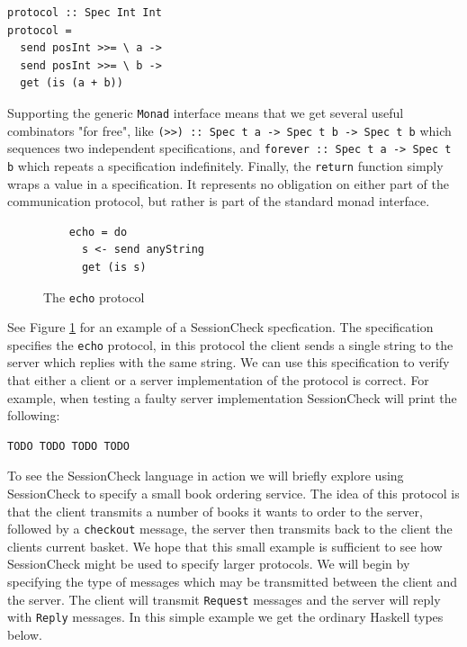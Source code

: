 \documentclass{article}
\begin{document}
\begin{verbatim}
protocol :: Spec Int Int
protocol =
  send posInt >>= \ a ->
  send posInt >>= \ b ->
  get (is (a + b))
\end{verbatim}


%
Supporting the generic \texttt{Monad} interface means that we get several useful combinators "for free", like
\texttt{(>>) :: Spec t a -> Spec t b -> Spec t b} which sequences two independent specifications, and
\texttt{forever :: Spec t a -> Spec t b} which repeats a specification indefinitely.
%
Finally, the \texttt{return} function simply wraps a value in a specification.
%
It represents no obligation on either part of the communication protocol, but rather is part of the standard
monad interface.
%

\begin{figure}
  \begin{verbatim}
    echo = do
      s <- send anyString
      get (is s)
  \end{verbatim}
  \caption{\label{fig:SessionCheck:echo} The \texttt{echo} protocol}
\end{figure}

See Figure \ref{fig:SessionCheck:echo} for an example of a SessionCheck specfication.
%
The specification specifies the \texttt{echo} protocol, in this protocol the client sends
a single string to the server which replies with the same string.
%
We can use this specification to verify that either a client or a server implementation of
the protocol is correct.
%
For example, when testing a faulty server implementation SessionCheck will print the following:
%
\begin{verbatim}
TODO TODO TODO TODO
\end{verbatim}


To see the SessionCheck language in action we will briefly explore using SessionCheck
to specify a small book ordering service.
%
The idea of this protocol is that the client transmits a number of books it wants to order to the
server, followed by a \texttt{checkout} message, the server then transmits back to the client
the clients current basket. 
%
We hope that this small example is sufficient to see how SessionCheck might be used to
specify larger protocols.
%
We will begin by specifying the type of messages which may be transmitted between the client and the
server.
%
The client will transmit \texttt{Request} messages and the server will reply with \texttt{Reply} messages.
%
In this simple example we get the ordinary Haskell types below.
\end{document}
